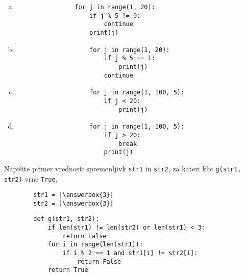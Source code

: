 \documentclass[arhiv, 10pt]{../izpit}
\newcommand{\inlinepy}[1]{\texttt{#1}}
\newcommand{\answerbox}[1]{\framebox{\vphantom{\large M}\hspace{#1cm}}}
\begin{document}
        \begin{multicols}{2}
        \begin{enumerate}[(a)]
\item 
            \begin{verbatim}
                for j in range(1, 20):
                    if j % 5 != 0:
                        continue
                    print(j)
            \end{verbatim}
        
\item 
                \begin{verbatim}
                    for j in range(1, 20):
                        if j % 5 == 1:
                            print(j)
                        continue
                \end{verbatim}
            
\item 
                \begin{verbatim}
                    for j in range(1, 100, 5):
                        if j < 20:
                            print(j)
                \end{verbatim}
            
\item 
                \begin{verbatim}
                    for j in range(1, 100, 5):
                        if j > 20:
                            break
                        print(j)
                \end{verbatim}
            
\end{enumerate}

        \end{multicols}
    
        \naloga*
        \begin{multicols}{2}
        \noindent
        Napišite primer vrednosti spremenljivk \inlinepy{str1} in \inlinepy{str2}, za kateri klic \inlinepy{g(str1, str2)} vrne \inlinepy{True}.
        \begin{verbatim}
        str1 = |\answerbox{3}|
        str2 = |\answerbox{3}|
        \end{verbatim}
        \vfil
        \columnbreak
        \begin{verbatim}
        def g(str1, str2):
            if len(str1) != len(str2) or len(str1) < 3:
                return False
            for i in range(len(str1)):
                if i % 2 == 1 and str1[i] != str2[i]:
                    return False
            return True
        \end{verbatim}
        \end{multicols}
    
\end{document}

